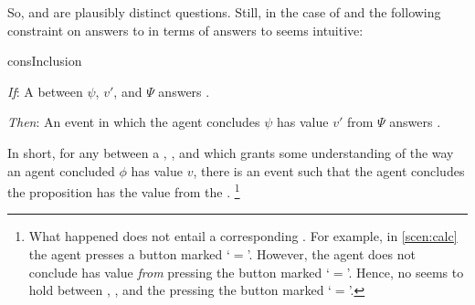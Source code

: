 \begin{note}
  So, \qWhy{} and \qHow{} are plausibly distinct questions.
  Still, in the case of \qWhy{} and \qHow{} the following constraint on answers to \qWhy{} in terms of answers to \qHow{} seems intuitive:

  \begin{constraint}{consInclusion}{\issueInclusion{}}
    \mbox{ }
    \vspace{-\baselineskip}
    \begin{itenum}
    \item[\emph{If}:]
      A \ros{} between \(\psi\), \(v'\), and \(\Psi\) answers \qWhy{}.
    \item[\emph{Then}:]
      An event in which the agent concludes \(\psi\) has value \(v'\) from \(\Psi\) answers \qHow{}.
    \end{itenum}
    \vspace{-\baselineskip}
  \end{constraint}

  \noindent%
  In short, for any \ros{} between a , , and \pool{} which grants some understanding of the way an agent concluded \(\phi\) has value \(v\), there is an event such that the agent concludes the proposition has the value from the \pool{}.%
  \footnote{
    What happened does not entail a corresponding \ros{}.
    For example, in \autoref{scen:calc} the agent presses a button marked `\(=\)'.
    However, the agent does not conclude \propM{\gistCalcEq{}} has value  \emph{from} pressing the button marked `\(=\)'.
    Hence, no \ros{} seems to hold between \propM{\gistCalcEq{}}, , and the pressing the button marked `\(=\)'.
  }
\end{note}

